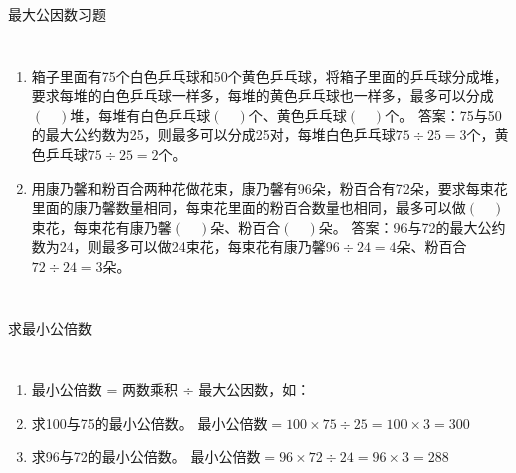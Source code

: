 \documentclass[aspectratio=169]{ctexbeamer} %
\begin{document}
\begin{frame}[t]{最大公因数习题}
\begin{columns}
\begin{enumerate}[label={\arabic*.}]
\item 箱子里面有75个白色乒乓球和50个黄色乒乓球，将箱子里面的乒乓球分成堆，要求每堆的白色乒乓球一样多，每堆的黄色乒乓球也一样多，最多可以分成$(\quad)$堆，每堆有白色乒乓球$(\quad)$个、黄色乒乓球$(\quad)$个。 \alert{答案：75与50的最大公约数为25，则最多可以分成25对，每堆白色乒乓球$75 \div 25 = 3$个，黄色乒乓球$75 \div 25 = 2$个。}
\item 用康乃馨和粉百合两种花做花束，康乃馨有96朵，粉百合有72朵，要求每束花里面的康乃馨数量相同，每束花里面的粉百合数量也相同，最多可以做$(\quad)$束花，每束花有康乃馨$(\quad)$朵、粉百合$(\quad)$朵。 \alert{答案：96与72的最大公约数为24，则最多可以做24束花，每束花有康乃馨$96 \div 24 = 4$朵、粉百合$72 \div 24 = 3$朵。}
\end{enumerate}
\end{columns}
\end{frame}

\begin{frame}[t]{求最小公倍数}
\begin{columns}
\begin{enumerate}[label={\arabic*.}]
\item 最小公倍数 = 两数乘积 ÷ 最大公因数，如：
\item 求100与75的最小公倍数。 最小公倍数$ = 100 \times 75 \div 25 = 100 \times 3 = 300$
\item 求96与72的最小公倍数。 最小公倍数$ = 96 \times 72 \div 24 = 96 \times 3 = 288$
\end{enumerate}
\end{columns}
\end{frame}
\end{document}
